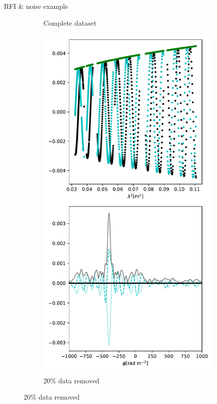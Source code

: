 \documentclass[xetex,aspectratio=169]{beamer}
\begin{document}
\begin{frame}{RFI \& noise example}
\begin{figure}
\begin{subfigure}{0.2\textwidth}
			\caption{Complete dataset}
		\end{subfigure}
		\begin{subfigure}{0.2\textwidth}
			\includegraphics[width=\textwidth]{figures/dataset_features/data_removed.pdf}
			\caption{20\% data removed}

\end{subfigure}
\end{figure}
\end{frame}
\end{document}
